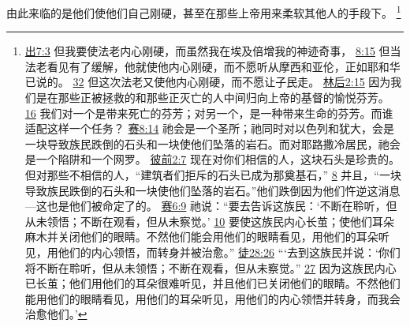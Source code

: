 \documentclass[12pt, a4paper, oneside]{ctexart}
\begin{document}
	由此来临的是他们使他们自己刚硬，甚至在那些上帝用来柔软其他人的手段下。
	\footnote {
		\href{https://biblehub.com/exodus/7-3.htm}{出7:3} 但我要使法老内心刚硬，而虽然我在埃及倍增我的神迹奇事，
		\href{https://biblehub.com/exodus/8-15.htm}{8:15} 但当法老看见有了缓解，他就使他内心刚硬，而不愿听从摩西和亚伦，正如耶和华已说的。
		\href{https://biblehub.com/exodus/8-32.htm}{32} 但这次法老又使他内心刚硬，而不愿让子民走。
		\href{https://biblehub.com/2_corinthians/2-15.htm}{林后2:15} 因为我们是在那些正被拯救的和那些正灭亡的人中间归向上帝的基督的愉悦芬芳。
		\href{https://biblehub.com/2_corinthians/2-16.htm}{16} 我们对一个是带来死亡的芬芳；对另一个，是一种带来生命的芬芳。而谁适配这样一个任务？
		\href{https://biblehub.com/isaiah/8-14.htm}{赛8:14} 祂会是一个圣所；祂同时对以色列和犹大，会是一块导致族民跌倒的石头和一块使他们坠落的岩石。而对耶路撒冷居民，祂会是一个陷阱和一个网罗。
		\href{https://biblehub.com/1_peter/2-7.htm}{彼前2:7} 现在对你们相信的人，这块石头是珍贵的。但对那些不相信的人，“建筑者们拒斥的石头已成为那奠基石，”
		\href{https://biblehub.com/1_peter/2-8.htm}{8} 并且，“一块导致族民跌倒的石头和一块使他们坠落的岩石。”他们跌倒因为他们忤逆这消息---这也是他们被命定了的。
		\href{https://biblehub.com/isaiah/6-9.htm}{赛6:9} 祂说：“要去告诉这族民：‘不断在聆听，但从未领悟；不断在观看，但从未察觉。’
		\href{https://biblehub.com/isaiah/6-10.htm}{10} 要使这族民内心长茧；使他们耳朵麻木并关闭他们的眼睛。不然他们能会用他们的眼睛看见，用他们的耳朵听见，用他们的内心领悟，而转身并被治愈。”
		\href{https://biblehub.com/acts/28-26.htm}{徒28:26} “‘去到这族民并说：‘你们将不断在聆听，但从未领悟；不断在观看，但从未察觉。”
		\href{https://biblehub.com/acts/28-27.htm}{27} 因为这族民内心已长茧；他们用他们的耳朵很难听见，并且他们已关闭他们的眼睛。不然他们能用他们的眼睛看见，用他们的耳朵听见，用他们的内心领悟并转身，而我会治愈他们。’
	}
\end{document}
